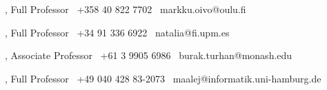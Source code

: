 \documentclass[9pt]{article}
\begin{document}
\bigskip
{}
\noindent\begin{minipage}[t]{2.5in}
, Full Professor
\newline{}
\newline\noindent \faPhone~+358 40 822 7702
\newline\noindent \faEnvelope~markku.oivo@oulu.fi
\end{minipage}
\hfill
\begin{minipage}[t]{2.5in}
, Full Professor
\newline{}
\newline\noindent \faPhone~+34 91 336 6922
\newline\noindent \faEnvelope~natalia@fi.upm.es
\end{minipage}

\bigskip
\medskip

\noindent\begin{minipage}[t]{2.5in}
  , Associate Professor
  \newline{}
  \newline\noindent \faPhone~+61 3 9905 6986
  \newline\noindent \faEnvelope~burak.turhan@monash.edu	
  \end{minipage}
\hfill
\noindent\begin{minipage}[t]{2.5in}
  , Full Professor
  \newline{}
  \newline\noindent \faPhone~+49 040 428 83-2073
  \newline\noindent \faEnvelope~maalej@informatik.uni-hamburg.de	
  \end{minipage}
\end{document}
